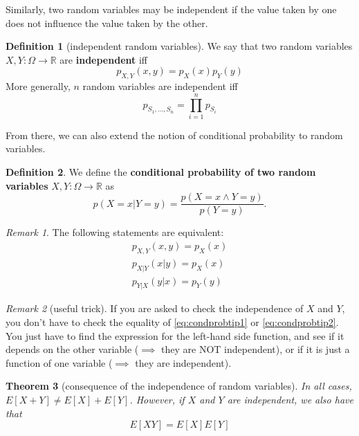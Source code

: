 \documentclass{report}
\theoremstyle{plain}
\newtheorem{thm}{Theorem}
\theoremstyle{definition}
\newtheorem{defn}[thm]{Definition}
\theoremstyle{remark}
\newtheorem*{remark}{Remark}
\begin{document}
Similarly, two random variables may be independent if the value taken by one does not influence the value taken by the other.

\begin{defn}[independent random variables]
	We say that two random variables $X, Y: \Omega \to \mathbb{R}$ are \textbf{independent} iff 
	\begin{equation}
		p_{X, Y}(x,y) = p_X(x)p_Y(y)
	\end{equation}
	More generally, $n$ random variables are independent iff
	\begin{equation}
		p_{S_1, \ldots, S_n} = \prod_{i=1}^n p_{S_i}
	\end{equation}
\end{defn}

From there, we can also extend the notion of conditional probability to random variables.
\begin{defn}
We define the \textbf{conditional probability of two random variables} $X, Y: \Omega \to \mathbb{R}$ as
\begin{equation}
	p(X=x | Y=y) = \dfrac{p(X=x \land Y=y)}{p(Y=y)}.
\end{equation}
\end{defn}

\begin{remark} The following statements are equivalent:
\begin{align}
	p_{X, Y}(x, y) = p_X(x) \\
	\label{eq:condprobtip1}
	p_{X|Y}(x|y) = p_X(x) \\
	\label{eq:condprobtip2}
	p_{Y|X}(y|x) = p_Y(y)
\end{align}
\end{remark}

\begin{remark}[useful trick] If you are asked to check the independence of $X$ and $Y$, you don't have to check the equality of \eqref{eq:condprobtip1} or \eqref{eq:condprobtip2}. You just have to find the expression for the left-hand side function, and see if it depends on the other variable ($\implies$ they are NOT independent), or if it is just a function of one variable ($\implies$ they are independent).
\end{remark}

\begin{thm}[consequence of the independence of random variables] In all cases, $E[X+Y] \neq E[X] + E[Y]$. However, if $X$ and $Y$ are \emph{independent}, we also have that
\begin{equation}
	E[XY] = E[X]E[Y]
\end{equation}
\end{thm}
\end{document}
